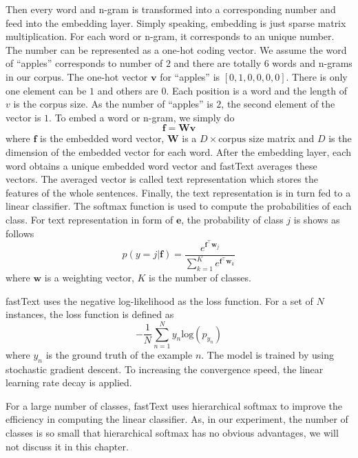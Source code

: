 Then every word and n-gram is transformed into a corresponding number and feed into the embedding layer. Simply speaking, embedding is just sparse matrix multiplication. For each word or n-gram, it corresponds to an unique number. The number can be represented as a one-hot coding vector. We assume the word of ``apples'' corresponds to number of $2$ and there are totally 6 words and n-grams in our corpus. The one-hot vector $\mathbf{v}$ for ``apples'' is $[0, 1, 0, 0, 0, 0]$. There is only one element can be $1$ and others are $0$. Each position is a word and the length of $v$ is the corpus size. As the number of ``apples'' is $2$, the second element of the vector is $1$. To embed a word or n-gram, we simply do
\begin{equation}
\label{embed}
\mathbf{f} = \mathbf{W} \mathbf{v}
\end{equation}
where $\mathbf{f}$ is the embedded word vector, $\mathbf{W}$ is a $D \times \mbox{corpus size}$ matrix and $D$ is the dimension of the embedded vector for each word. After the embedding layer, each word obtains a unique embedded word vector and fastText averages these vectors. The averaged vector is called text representation which stores the features of the whole sentences. Finally, the text representation is in turn fed to a linear classifier. The softmax function is used to compute the probabilities of each class. For text representation in form of $\mathbf{e}$, the probability of class $j$ is shows as follows
\begin{equation}
p(y=j|\mathbf{f}) = \frac{e^{\mathbf{f}^\intercal \mathbf{w}_j}} {\sum_{k=1}^K e^{\mathbf{f}^\intercal\mathbf{w}_k}}
\end{equation}
where $\mathbf{w}$ is a weighting vector, $K$ is the number of classes. 

fastText uses the negative log-likelihood as the loss function. For a set of $N$ instances, the loss function is defined as 
\begin{equation}
-\frac{1}{N}\sum_{n=1}^{N}y_n\mbox{log}({p_{y_n}})
\end{equation}
where $y_n$ is the ground truth of the example $n$. The model is trained by using stochastic gradient descent. To increasing the convergence speed, the linear learning rate decay is applied.

For a large number of classes, fastText uses hierarchical softmax to improve the efficiency in computing the linear classifier. As, in our experiment, the number of classes is so small that hierarchical softmax has no obvious advantages, we will not discuss it in this chapter.

